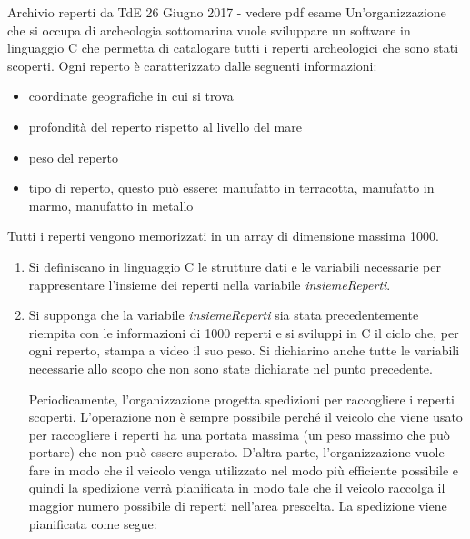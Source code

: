\documentclass[aspectratio=169, handout]{beamer}
\begin{document}
\begin{frame}[allowframebreaks]{Archivio reperti da TdE 26 Giugno 2017 - vedere pdf esame}
    Un’organizzazione che si occupa di archeologia sottomarina vuole sviluppare un software in linguaggio C
    che permetta di catalogare tutti i reperti archeologici che sono stati scoperti. Ogni reperto è caratterizzato
    dalle seguenti informazioni:
    \begin{itemize}
        \item coordinate geografiche in cui si trova
        \item profondità del reperto rispetto al livello del mare
        \item  peso del reperto
        \item  tipo di reperto, questo può essere: manufatto in terracotta, manufatto in marmo, manufatto in metallo
    \end{itemize}
    Tutti i reperti vengono memorizzati in un array di dimensione massima 1000.

    \begin{enumerate}
        \item Si definiscano in linguaggio C le strutture dati e le variabili necessarie per rappresentare l’insieme dei
            reperti nella variabile \emph{insiemeReperti}.
        \item  Si supponga che la variabile \emph{insiemeReperti} sia stata precedentemente riempita con le informazioni
            di 1000 reperti e si sviluppi in C il ciclo che, per ogni reperto, stampa a video il suo peso. Si dichiarino
            anche tutte le variabili necessarie allo scopo che non sono state dichiarate nel punto precedente.

            Periodicamente, l’organizzazione progetta spedizioni per raccogliere i reperti scoperti. L’operazione non è
            sempre possibile perché il veicolo che viene usato per raccogliere i reperti ha una portata massima (un peso
            massimo che può portare) che non può essere superato. D’altra parte, l’organizzazione vuole fare in modo
            che il veicolo venga utilizzato nel modo più efficiente possibile e quindi la spedizione verrà pianificata in
            modo tale che il veicolo raccolga il maggior numero possibile di reperti nell'area prescelta. La spedizione
            viene pianificata come segue:


\end{enumerate}
\end{frame}
\end{document}
